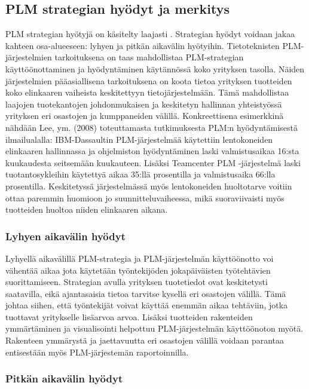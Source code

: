 \subsection{PLM strategian hyödyt ja merkitys} \label{PLM strategian hyödyt}

PLM strategian hyötyjä on käsitelty laajasti \cite{alemanni_key_2008} \cite{rivest_product_2012}. Strategian hyödyt voidaan jakaa kahteen osa-alueeseen: lyhyen ja pitkän aikavälin hyötyihin. Tietoteknisten PLM-järjestelmien tarkoituksena on taas mahdollistaa PLM-strategian käyttöönottaminen ja hyödyntäminen käytännössä koko yrityksen tasolla. Näiden järjestelmien pääasiallisena tarkoituksena on koota tietoa yrityksen tuotteiden koko elinkaaren vaiheista keskitettyyn tietojärjestelmään. Tämä mahdollistaa laajojen tuotekantojen johdonmukaisen ja keskitetyn hallinnan yhteistyössä yrityksen eri osastojen ja kumppaneiden välillä. Konkreettisena esimerkkinä nähdään Lee, ym. (2008) toteuttamasta tutkimuksesta PLM:n hyödyntämisestä ilmailualalla: IBM-Dassaultin PLM-järjestelmää käytettiin lentokoneiden elinkaaren hallinnassa ja ohjelmiston hyödyntäminen laski valmistusaikaa 16:sta kuukaudesta seitsemään kuukauteen. Lisäksi Teamcenter PLM -järjestelmä laski tuotantosykleihin käytettyä aikaa 35:llä prosentilla ja valmistusaika 66:lla prosentilla. Keskitetyssä järjestelmässä myös lentokoneiden huoltotarve voitiin ottaa paremmin huomioon jo suunnitteluvaiheessa, mikä suoraviivaisti myös tuotteiden huoltoa niiden elinkaaren aikana. \cite{lee_product_2008}

\subsubsection{Lyhyen aikavälin hyödyt} \label{Lyhyen aikavälin hyödyt}

Lyhyellä aikavälillä PLM-strategia ja PLM-järjestelmän käyttöönotto voi vähentää aikaa jota käytetään työntekijöden jokapäiväisten työtehtävien suorittamiseen. Strategian avulla yrityksen tuotetiedot ovat keskitetysti saatavilla, eikä ajantasaisia tietoa tarvitse kysellä eri osastojen välillä. Tämä johtaa siihen, että työntekijät voivat käyttää enemmän aikaa tehtäviin, jotka tuottavat yritykselle lisäarvoa arvoa. Lisäksi tuotteiden rakenteiden ymmärtäminen ja visualisointi helpottuu PLM-järjestelmän käyttöönoton myötä. Rakenteen ymmärystä ja jaettavuutta eri osastojen välillä voidaan parantaa entisestään myös PLM-järjestemän raportoinnilla. \cite{alemanni_key_2008}

\subsubsection{Pitkän aikavälin hyödyt} \label{Pitkän aikavälin hyödyt}

